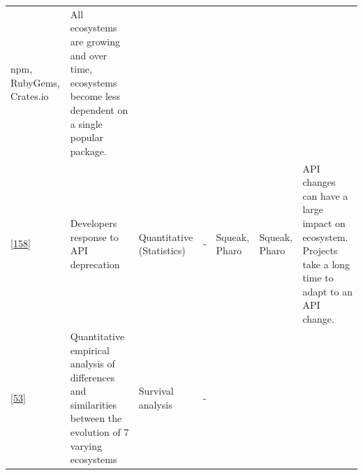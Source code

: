 \documentclass[]{book}
\begin{document}
\begin{longtable}[]{@{}lllllll@{}}
\begin{minipage}[t]{0.12\columnwidth}
npm, RubyGems, Crates.io\strut
\end{minipage} & \begin{minipage}[t]{0.10\columnwidth}\raggedright\strut
All ecosystems are growing and over time, ecosystems become less
dependent on a single popular package.\strut
\end{minipage}\tabularnewline
\begin{minipage}[t]{0.09\columnwidth}\raggedright\strut
{[}\protect\hyperlink{ref-Robbes2012}{158}{]}\strut
\end{minipage} & \begin{minipage}[t]{0.16\columnwidth}\raggedright\strut
Developers response to API deprecation\strut
\end{minipage} & \begin{minipage}[t]{0.17\columnwidth}\raggedright\strut
Quantitative (Statistics)\strut
\end{minipage} & \begin{minipage}[t]{0.07\columnwidth}\raggedright\strut
-\strut
\end{minipage} & \begin{minipage}[t]{0.10\columnwidth}\raggedright\strut
Squeak, Pharo\strut
\end{minipage} & \begin{minipage}[t]{0.12\columnwidth}\raggedright\strut
Squeak, Pharo\strut
\end{minipage} & \begin{minipage}[t]{0.10\columnwidth}\raggedright\strut
API changes can have a large impact on ecosystem. Projects take a long
time to adapt to an API change.\strut
\end{minipage}\tabularnewline
\begin{minipage}[t]{0.09\columnwidth}\raggedright\strut
{[}\protect\hyperlink{ref-Decan2018}{53}{]}\strut
\end{minipage} & \begin{minipage}[t]{0.16\columnwidth}\raggedright\strut
Quantitative empirical analysis of differences and similarities between
the evolution of 7 varying ecosystems\strut
\end{minipage} & \begin{minipage}[t]{0.17\columnwidth}\raggedright\strut
Survival analysis\strut
\end{minipage} & \begin{minipage}[t]{0.07\columnwidth}\raggedright\strut
-\strut
\end{minipage} & \begin{minipage}[t]{0.10\columnwidth}\raggedright\strut

\end{minipage}
\end{longtable}
\end{document}
